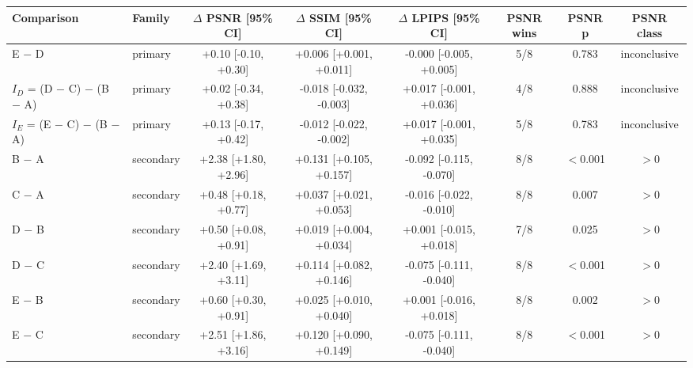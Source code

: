 \begin{tabular}{llcccccc}
\toprule
Comparison & Family & $\Delta$ PSNR [95\% CI] & $\Delta$ SSIM [95\% CI] & $\Delta$ LPIPS [95\% CI] & PSNR wins & PSNR p & PSNR class \\
\midrule
E $-$ D & primary & +0.10 [-0.10, +0.30] & +0.006 [+0.001, +0.011] & -0.000 [-0.005, +0.005] & 5/8 & 0.783 & inconclusive \\
$I_D$ = (D $-$ C) $-$ (B $-$ A) & primary & +0.02 [-0.34, +0.38] & -0.018 [-0.032, -0.003] & +0.017 [-0.001, +0.036] & 4/8 & 0.888 & inconclusive \\
$I_E$ = (E $-$ C) $-$ (B $-$ A) & primary & +0.13 [-0.17, +0.42] & -0.012 [-0.022, -0.002] & +0.017 [-0.001, +0.035] & 5/8 & 0.783 & inconclusive \\
B $-$ A & secondary & +2.38 [+1.80, +2.96] & +0.131 [+0.105, +0.157] & -0.092 [-0.115, -0.070] & 8/8 & $<$0.001 & $>$0 \\
C $-$ A & secondary & +0.48 [+0.18, +0.77] & +0.037 [+0.021, +0.053] & -0.016 [-0.022, -0.010] & 8/8 & 0.007 & $>$0 \\
D $-$ B & secondary & +0.50 [+0.08, +0.91] & +0.019 [+0.004, +0.034] & +0.001 [-0.015, +0.018] & 7/8 & 0.025 & $>$0 \\
D $-$ C & secondary & +2.40 [+1.69, +3.11] & +0.114 [+0.082, +0.146] & -0.075 [-0.111, -0.040] & 8/8 & $<$0.001 & $>$0 \\
E $-$ B & secondary & +0.60 [+0.30, +0.91] & +0.025 [+0.010, +0.040] & +0.001 [-0.016, +0.018] & 8/8 & 0.002 & $>$0 \\
E $-$ C & secondary & +2.51 [+1.86, +3.16] & +0.120 [+0.090, +0.149] & -0.075 [-0.111, -0.040] & 8/8 & $<$0.001 & $>$0 \\
\bottomrule
\end{tabular}

